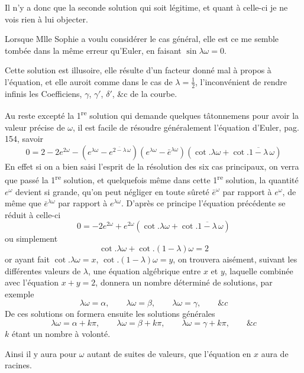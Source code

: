 \documentclass[11pt,a4paper]{article}
\begin{document}
Il n'y a donc que la seconde solution qui soit légitime, et quant à celle-ci je
ne vois rien à lui objecter.

Lorsque Mlle Sophie a voulu considérer le cas général, elle est ce me semble
tombée dans la même erreur qu'Euler, en faisant $\sin\lambda\omega = 0$.

Cette solution est illusoire, elle résulte d'un facteur donné mal à propos à
l'équation, et elle auroit comme dans le cas de $\lambda = \frac{1}{2}$,
l'inconvénient de rendre infinis les Coefficiens, $\gamma$, $\gamma'$,
$\delta'$, \&c de la courbe.

Au reste excepté la 1\textsuperscript{re} solution qui demande quelques
tâtonnemens pour avoir la valeur précise de $\omega$, il est facile de
\struck{\ill{}} résoudre généralement l'équation d'Euler, pag. 154, savoir
\[
  0 = 2 - 2e^{2\omega}
      - \left(e^{\lambda\omega} - e^{\overline{2-\lambda}\,\omega}\right)
        \left(e^{\lambda\omega} - \bar{e}^{\lambda\omega}\right)
        \left(\cot.\lambda\omega + \cot.\overline{1-\lambda}\,\omega\right)
\]
En effet si on a bien saisi l'esprit de la résolution des six cas principaux,
on verra que passé la 1\textsuperscript{re} solution, et quelquefois même dans
cette 1\textsuperscript{re} solution, la quantité $e^{\omega}$ devient si
grande, qu'on peut négliger en toute sûreté $\bar{e}^{\omega}$ par rapport à
$e^{\omega}$, de même que $\bar{e}^{\lambda\omega}$ par rapport à
$e^{\lambda\omega}$. D'après ce principe l'équation précédente se réduit à
celle-ci
\[
  0 = -2e^{2\omega} + e^{2\omega}
      \left(\cot.\lambda\omega + \cot.\overline{1-\lambda}\,\omega\right)
\]
ou simplement
\[
  \cot.\lambda\omega + \cot.(1-\lambda)\omega = 2
\]
or ayant fait $\cot.\lambda\omega = x$, $\cot.(1-\lambda)\omega = y$, on
trouvera aisément, suivant les différentes valeurs de $\lambda$, une équation
algébrique entre $x$ et $y$, laquelle combinée avec l'équation $x + y = 2$,
donnera un nombre déterminé de solutions, par exemple
\[
  \lambda\omega = \alpha, \qquad \lambda\omega = \beta, \qquad
  \lambda\omega = \gamma, \qquad \&c
\]
De ces solutions on formera ensuite les solutions générales
\[
  \lambda\omega = \alpha + k\pi, \qquad \lambda\omega = \beta + k\pi, \qquad
  \lambda\omega = \gamma + k\pi, \qquad \&c
\]
$k$ étant un nombre à volonté.

Ainsi il y aura pour $\omega$ autant de suites de valeurs, que l'équation en
$x$ aura de racines.
\end{document}
